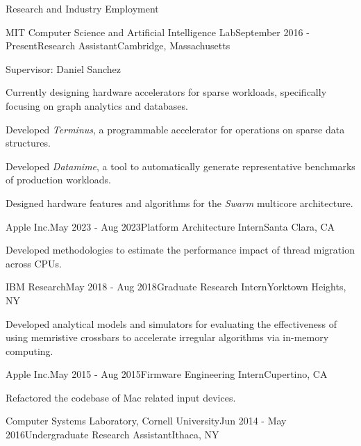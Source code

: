 \documentclass{resume} %
\begin{document}
\begin{rSection}{Research and Industry Employment}

\begin{rSubsection}{MIT Computer Science and Artificial Intelligence Lab}{September 2016 - Present}{Research Assistant}{Cambridge, Massachusetts}

\item Supervisor: Daniel Sanchez
\item Currently designing hardware accelerators for sparse workloads, specifically focusing on graph analytics and databases.
\item Developed {\it Terminus}, a programmable accelerator for operations on sparse data structures.
\item Developed {\it Datamime}, a tool to automatically generate representative benchmarks of production workloads.
\item Designed hardware features and algorithms for the {\it Swarm} multicore architecture.
\end{rSubsection}

\begin{rSubsection}{Apple Inc.}{May 2023 - Aug 2023}{Platform Architecture Intern}{Santa Clara, CA}

\item Developed methodologies to estimate the performance impact of thread migration across CPUs.
\end{rSubsection}

\begin{rSubsection}{IBM Research}{May 2018 - Aug 2018}{Graduate Research Intern}{Yorktown Heights, NY}

\item Developed analytical models and simulators for evaluating the effectiveness of using memristive crossbars
to accelerate irregular algorithms via in-memory computing.
\end{rSubsection}

\begin{rSubsection}{Apple Inc.}{May 2015 - Aug 2015}{Firmware Engineering Intern}{Cupertino, CA}

\item Refactored the codebase of Mac related input devices. 
\end{rSubsection}

\begin{rSubsection}{Computer Systems Laboratory, Cornell University}{Jun 2014 - May 2016}{Undergraduate Research Assistant}{Ithaca, NY}


\end{rSubsection}
\end{rSection}
\end{document}
